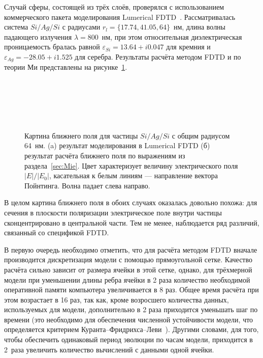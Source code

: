 Случай сферы, состоящей из трёх слоёв, проверялся с использованием
коммерческого пакета моделирования Lumerical
FDTD~\cite{Lumerical-web}. Рассматривалась система $Si/Ag/Si$ с
радиусами $r_l=\{17.74, 41.05, 64\}$~нм, длина волны падающего
излучения $\lambda = 800$~нм, при этом относительная диэлектрическая
проницаемость бралась равной $\varepsilon_{Si} = 13.64 + i 0.047$ для
кремния и $\varepsilon_{Ag} = -28.05 + i 1.525$ для серебра.
Результаты расчёта методом FDTD и по теории Ми представлены на
рисунке~\ref{img:fdtd}.
\begin{figure}[p] 
  \begin{minipage}[ht]{0.99\linewidth}
  \end{minipage}\\
  \vfill
  \begin{minipage}[ht]{0.99\linewidth}
  \end{minipage}\\
  \vfill
  \begin{minipage}[ht]{0.99\linewidth}
  \end{minipage}\\
  \vfill
  \begin{minipage}[ht]{0.99\linewidth}
  \end{minipage}
  \caption{Картина ближнего поля для частицы $Si/Ag/Si$ с общим
    радиусом 64~нм. (a) результат моделирования в Lumerical FDTD (б)
    результат расчёта ближнего поля по выражениям из
    раздела~\ref{sec:Mie}. Цвет характеризует величину электрического
    поля $|E|/|E_0|$, касательная к белым линиям --- направление
    вектора Пойнтинга. Волна падает слева направо.\label{img:fdtd}}
\end{figure}

В целом картина ближнего поля в обоих случаях оказалась довольно
похожа: для сечения в плоскости поляризации электрическое поле внутри
частицы сконцентрировано в центральной части. Тем не менее,
наблюдается ряд различий, связанный со спецификой FDTD.

В первую очередь необходимо отметить, что для расчёта методом FDTD
вначале производится дискретизация модели с помощью прямоугольной
сетке. Качество расчёта сильно зависит от размера ячейки в этой сетке,
однако, для трёхмерной модели при уменьшении длины ребра ячейки в 2
раза количество необходимой оперативной памяти компьютера
увеличивается в 8 раз.  Общее время расчёта при этом возрастает в 16
раз, так как, кроме возросшего количества данных, используемых для
модели, дополнительно в 2 раза приходится уменьшать шаг по времени
(это необходимо для обеспечения численной устойчивости модели, что
определяется критерием
Куранта--Фридрихса--Леви~\cite{Courant-1941}). Другими словами, для
того, чтобы обеспечить одинаковый период эволюции по часам модели,
приходится в 2~раза увеличить количество вычислений с данными одной
ячейки.


